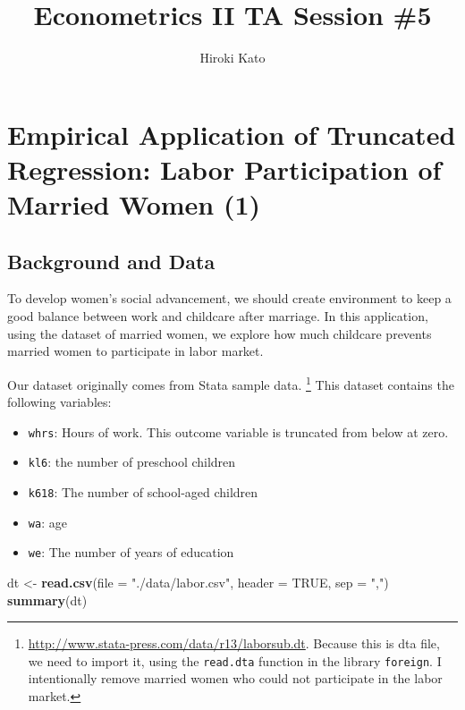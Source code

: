 \documentclass[
  12pt,
]{article}
\title{Econometrics II TA Session \#5}
\author{Hiroki Kato}
\date{}
\newenvironment{Shaded}{\begin{snugshade}}{\end{snugshade}}
\newcommand{\DataTypeTok}[1]{\textcolor[rgb]{0.13,0.29,0.53}{#1}}
\newcommand{\KeywordTok}[1]{\textcolor[rgb]{0.13,0.29,0.53}{\textbf{#1}}}
\newcommand{\NormalTok}[1]{#1}
\newcommand{\OtherTok}[1]{\textcolor[rgb]{0.56,0.35,0.01}{#1}}
\newcommand{\StringTok}[1]{\textcolor[rgb]{0.31,0.60,0.02}{#1}}
\providecommand{\tightlist}{%
  \setlength{\itemsep}{0pt}\setlength{\parskip}{0pt}}
\begin{document}
\maketitle

\hypertarget{empirical-application-of-truncated-regression-labor-participation-of-married-women-1}{%
\section{Empirical Application of Truncated Regression: Labor
Participation of Married Women
(1)}\label{empirical-application-of-truncated-regression-labor-participation-of-married-women-1}}

\hypertarget{background-and-data}{%
\subsection{Background and Data}\label{background-and-data}}

To develop women's social advancement, we should create environment to
keep a good balance between work and childcare after marriage. In this
application, using the dataset of married women, we explore how much
childcare prevents married women to participate in labor market.

Our dataset originally comes from Stata sample data. \footnote{\url{http://www.stata-press.com/data/r13/laborsub.dt}.
  Because this is dta file, we need to import it, using the
  \texttt{read.dta} function in the library \texttt{foreign}. I
  intentionally remove married women who could not participate in the
  labor market.} This dataset contains the following variables:

\begin{itemize}
\tightlist
\item
  \texttt{whrs}: Hours of work. This outcome variable is truncated from
  below at zero.
\item
  \texttt{kl6}: the number of preschool children
\item
  \texttt{k618}: The number of school‐aged children
\item
  \texttt{wa}: age
\item
  \texttt{we}: The number of years of education
\end{itemize}

\begin{Shaded}
\begin{Highlighting}[]
\NormalTok{dt \textless{}{-}}\StringTok{ }\KeywordTok{read.csv}\NormalTok{(}\DataTypeTok{file =} \StringTok{"./data/labor.csv"}\NormalTok{, }\DataTypeTok{header =} \OtherTok{TRUE}\NormalTok{,  }\DataTypeTok{sep =} \StringTok{","}\NormalTok{)}
\KeywordTok{summary}\NormalTok{(dt)}
\end{Highlighting}
\end{Shaded}
\end{document}
